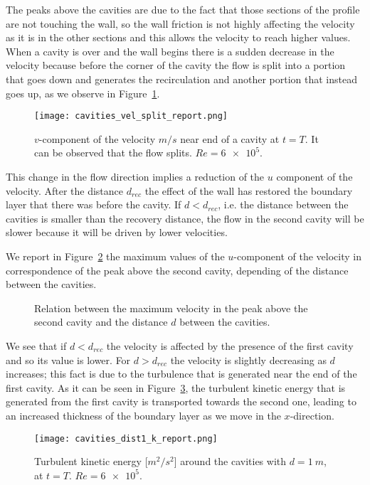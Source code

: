 The peaks above the cavities are due to the fact that those sections of the profile are not 
touching the wall, so the wall friction is not highly affecting the velocity as it is
in the other sections and this allows the velocity to reach higher values.
When a cavity is over and the wall begins there is a sudden decrease in the 
velocity because before the corner of the cavity the flow is split into a 
portion that goes down and generates the recirculation and another portion that 
instead goes up, as we observe in Figure~\ref{fig:vel_split}.
\begin{figure}
	\centering
	\texttt{[image: cavities\_vel\_split\_report.png]}
	\caption[$v$-component of the velocity near end of a cavity in the cavities problem]{$v$-component of the velocity $\si{m/s}$ near end of a cavity at $t=T$. It can be observed that the flow splits. $Re = \num{6e5}$.}
	\label{fig:vel_split}
\end{figure}
This change in the flow direction implies a reduction of the $u$ component of the velocity. After the 
distance $d_{rec}$ the effect of the wall has restored the boundary layer that 
there was before the cavity. If $d < d_{rec}$, i.e. the distance between the 
cavities is smaller than the recovery distance, the flow in the second 
cavity will be slower because it will be driven by lower velocities.

We report in Figure~\ref{fig:velpeaks} the maximum values of the $u$-component 
of the velocity in correspondence of the peak above the second cavity, depending 
of the distance between the cavities.
\begin{figure}
	\centering
	
	\caption[Relation between the maximum velocity above the second cavity and 
	the distance between the cavities]{Relation between the maximum velocity in the peak above the second cavity and the distance $d$ between the cavities.}
	\label{fig:velpeaks}
\end{figure}
We see that if $d < d_{rec}$ the velocity is affected by the presence of 
the first cavity and so its value is lower. For $d>d_{rec}$ the velocity is 
slightly decreasing as $d$ increases; this fact is due to the turbulence that 
is generated near the end of the first cavity. As it can be seen in 
Figure~\ref{fig:kd1}, the turbulent kinetic energy that is generated from the 
first cavity is transported towards the second one, leading to an increased 
thickness of the boundary layer as we move in the $x$-direction.
\begin{figure}
	\centering
	\texttt{[image: cavities\_dist1\_k\_report.png]}
	\caption[Turbulen kinetic energy in the cavities problem]{Turbulent kinetic energy [$\si{m^2/s^2}$] around the cavities with $d=\SI{1}{m}$, at $t=T$. $Re=\num{6e5}$.}
	\label{fig:kd1}
\end{figure}
%
